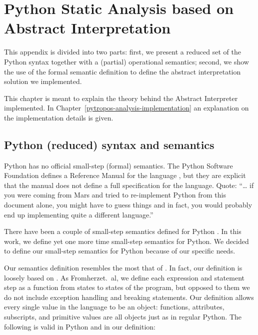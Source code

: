 \chapter{Python Static Analysis based on Abstract Interpretation}%
\label{appendix-ai-theory}

This appendix is divided into two parts: first, we present a reduced set of the Python
syntax together with a (partial) operational semantics; second, we show the use of the
formal semantic definition to define the abstract interpretation solution we implemented.

This chapter is meant to explain the theory behind the Abstract Interpreter implemented.
In Chapter~\ref{pytropos-analysis-implementation} an explanation on the implementation
details is given.

\section{Python (reduced) syntax and semantics}

Python has no official small-step (formal) semantics. The Python Software Foundation
defines a Reference Manual for the language
\autocite{python_software_foundation_python_2019}, but they are explicit that the manual
does not define a full specification for the language. Quote: \enquote{\ldots{} if you
were coming from Mars and tried to re-implement Python from this document alone, you might
have to guess things and in fact, you would probably end up implementing quite a different
language.}

There have been a couple of small-step semantics defined for Python
\autocites{politz_python_2013}{fromherz_static_2018}{guth_formal_2013}{ranson_semantics_2008}.
In this work, we define yet one more time small-step semantics for Python. We decided to
define our small-step semantics for Python because of our specific needs.

Our semantics definition resembles the most that of \textcite{fromherz_static_2018}. In
fact, our
definition is loosely based on \textcite{fromherz_static_2018}. As Fromherzet.~al, we
define each expression and statement step as a function from states to states of the
program, but opposed to them we do not include exception handling and breaking statements.
Our definition allows every single value in the language to be an object: functions,
attributes, subscripts, and primitive values are all objects just as in regular Python.
The following is valid in Python and in our definition:

